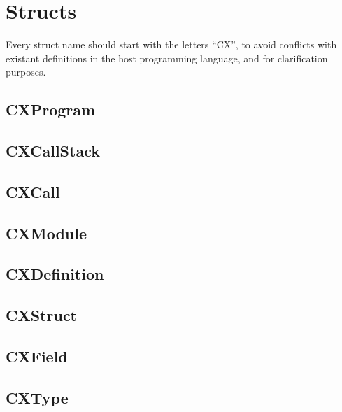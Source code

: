 \chapter{Structs}
\label{structs}

Every struct name should start with the letters ``CX'', to avoid conflicts
with existant definitions in the host programming language, and for
clarification purposes.

\section{CXProgram}
\label{cxprogram}

\section{CXCallStack}
\label{cxcallstack}

\section{CXCall}
\label{cxcall}


\section{CXModule}
\label{cxmodule}

\section{CXDefinition}
\label{cxdefinition}

\section{CXStruct}
\label{cxstruct}

\section{CXField}
\label{cxfield}

\section{CXType}
\label{cxtype}

